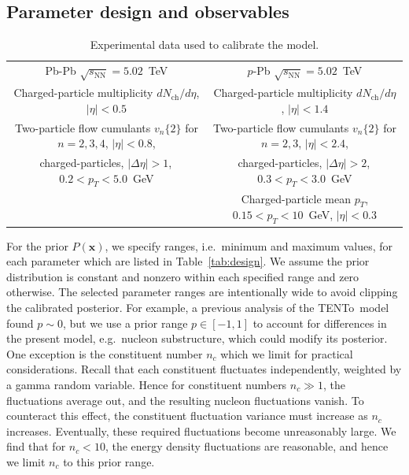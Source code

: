 \documentclass[aps,prc,reprint,amsmath,nofootinbib]{revtex4-1}
\newcommand{\trento}{T\raisebox{-0.5ex}{R}ENTo}
\newcommand{\sqrts}{\sqrt{s_\mathrm{NN}}}
\newcommand{\nch}{N_\text{ch}}
\newcommand{\vnk}[2]{v_#1\{#2\}}
\newcommand{\xv}{\mathbf x}
\newcommand{\paddedhline}{\noalign{\smallskip}\hline\noalign{\smallskip}}
\begin{document}
\subsection{Parameter design and observables}
\label{sec:observables}

\begin{table}
  \caption{
    \label{tab:observables}
    Experimental data used to calibrate the model.
  }
  \begin{ruledtabular}
  \begin{tabular}{cc}
    Pb-Pb $\sqrts=5.02$~TeV & $p$-Pb $\sqrts=5.02$~TeV \\
    \paddedhline
    Charged-particle multiplicity $d\nch/d\eta$, $|\eta| < 0.5$ \cite{Adam:2015ptt} & Charged-particle multiplicity $d\nch/d\eta$, $|\eta| < 1.4$ \cite{Adam:2014qja} \\
    \noalign{\smallskip}
  Two-particle flow cumulants  $\vnk{n}{2}$ for $n=2,3,4$, $|\eta| < 0.8$,  & Two-particle flow cumulants $\vnk{n}{2}$ for $n=2,3$, $|\eta| < 2.4$, \\
    charged-particles, $|\Delta\eta| > 1$,\, $0.2 < p_T < 5.0$~GeV \cite{Adam:2016izf} & charged-particles, $|\Delta\eta| > 2$,\, $0.3 < p_T < 3.0$~GeV \cite{Chatrchyan:2013nka}\\
    \noalign{\smallskip}
    & Charged-particle mean $p_T$, $0.15 < p_T < 10$~GeV, $|\eta| < 0.3$ \cite{Abelev:2013bla}\\
  \end{tabular}
  \end{ruledtabular}
\end{table}

For the prior $P(\xv)$, we specify ranges, i.e.\ minimum and maximum values, for each parameter which are listed in Table~\ref{tab:design}.
We assume the prior distribution is constant and nonzero within each specified range and zero otherwise.
The selected parameter ranges are intentionally wide to avoid clipping the calibrated posterior.
For example, a previous analysis of the \trento\ model \cite{Bernhard:2016tnd} found $p \sim 0$, but we use a prior range $p \in [-1, 1]$ to account for differences in the present model, e.g.\ nucleon substructure, which could modify its posterior.
One exception is the constituent number $n_c$ which we limit for practical considerations.
Recall that each constituent fluctuates independently, weighted by a gamma random variable.
Hence for constituent numbers $n_c \gg 1$, the fluctuations average out, and the resulting nucleon fluctuations vanish.
To counteract this effect, the constituent fluctuation variance must increase as $n_c$ increases.
Eventually, these required fluctuations become unreasonably large.
We find that for $n_c < 10$, the energy density fluctuations are reasonable, and hence we limit $n_c$ to this prior range.
\end{document}
